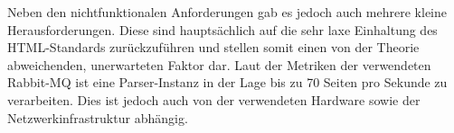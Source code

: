 Neben den nichtfunktionalen Anforderungen gab es jedoch auch mehrere kleine Herausforderungen.
Diese sind hauptsächlich auf die sehr laxe Einhaltung des HTML-Standards zurückzuführen und stellen somit einen von
der Theorie abweichenden, unerwarteten Faktor dar.
Laut der Metriken der verwendeten Rabbit-MQ ist eine Parser-Instanz in der Lage bis zu 70 Seiten pro Sekunde zu
verarbeiten.
Dies ist jedoch auch von der verwendeten Hardware sowie der Netzwerkinfrastruktur abhängig.
